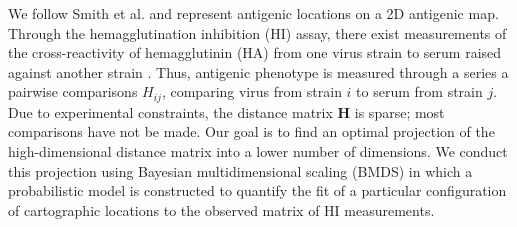 \documentclass[11pt,oneside,letterpaper]{article}
\begin{document}
We follow Smith et al. \cite{Smith04} and represent antigenic locations on a 2D antigenic map. 
Through the hemagglutination inhibition (HI) assay, there exist measurements of the cross-reactivity of hemagglutinin (HA) from one virus strain to serum raised against another strain \cite{Hirst43}. 
Thus, antigenic phenotype is measured through a series a pairwise comparisons $H_{ij}$, comparing virus from strain $i$ to serum from strain $j$. 
Due to experimental constraints, the distance matrix $\mathbf{H}$ is sparse; most comparisons have not be made. 
Our goal is to find an optimal projection of the high-dimensional distance matrix into a lower number of dimensions. 
We conduct this projection using Bayesian multidimensional scaling (BMDS) \cite{Oh01} in which a probabilistic model is constructed to quantify the fit of a particular configuration of cartographic locations to the observed matrix of HI measurements.
\end{document}
